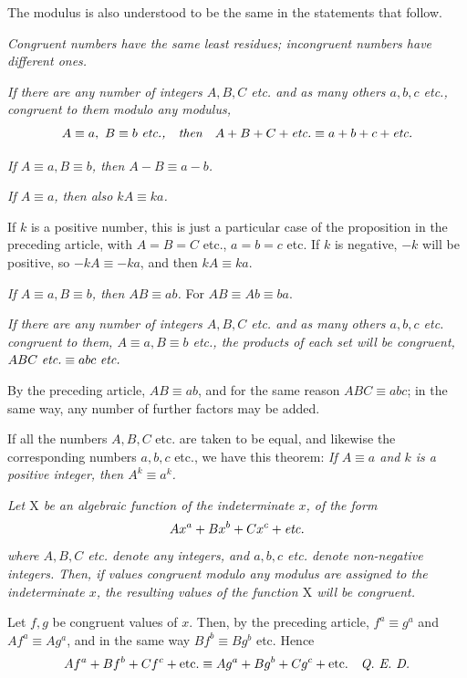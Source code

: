 The modulus is also understood to be the same in the statements that follow.

\emph{Congruent numbers have the same least residues; incongruent numbers have different ones.}


\emph{If there are any number of integers $A, B, C$ etc. and as many others $a, b, c$ etc., congruent to them modulo any modulus,}
\[
A\equiv a,\ B\equiv b\ \text{\itshape etc.,\quad then}\quad A+B+C+\text{\itshape etc.}\equiv a+b+c+\text{\itshape etc.}
\]

\emph{If $A\equiv a, B\equiv b$, then $A-B\equiv a-b$.}


\emph{If $A\equiv a$, then also $kA\equiv ka$.}

If $k$ is a positive number, this is just a particular case of the proposition in the preceding article, with $A=B=C$ etc., $a=b=c$ etc. If $k$ is negative, $-k$ will be positive, so $-kA\equiv -ka$, and then $kA\equiv ka$.

\emph{If $A\equiv a, B\equiv b$, then $AB\equiv ab$.} For $AB\equiv Ab\equiv ba$.


\emph{If there are any number of integers $A, B, C$ etc. and as many others $a, b, c$ etc. congruent to them, $A\equiv a, B\equiv b$ etc., the products of each set will be congruent, $ABC\ \text{\itshape etc.}\equiv abc\ \text{\itshape etc.}$}

By the preceding article, $AB\equiv ab$, and for the same reason $ABC\equiv abc$; in the same way, any number of further factors may be added.

If all the numbers $A, B, C$ etc. are taken to be equal, and likewise the corresponding numbers $a, b, c$ etc., we have this theorem: \emph{If $A\equiv a$ and $k$ is a positive integer, then $A^{k}\equiv a^{k}$.}


\emph{Let $\mathrm{X}$ be an algebraic function of the indeterminate $x$, of the form}
\[
Ax^{a}+Bx^{b}+Cx^{c}+\text{\itshape etc.}
\]
\emph{where $A, B, C$ etc. denote any integers, and $a, b, c$ etc. denote non-negative integers. Then, if values congruent modulo any modulus are assigned to the indeterminate $x$, the resulting values of the function $\mathrm{X}$ will be congruent.}

Let $f, g$ be congruent values of $x$. Then, by the preceding article, $f^{a}\equiv g^{a}$ and $Af^{a}\equiv Ag^{a}$, and in the same way $Bf^{b}\equiv Bg^{b}$ etc. Hence
\[
Af^{a}+Bf^{b}+Cf^{c}+\text{etc.}\equiv Ag^{a}+Bg^{b}+Cg^{c}+\text{etc.}\quad\text{\itshape Q. E. D.}
\]

